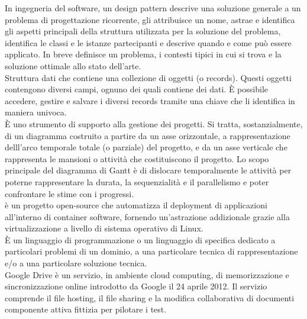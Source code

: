 \documentclass{scalatekids-article}
\begin{document}
 In ingegneria del software, un design pattern descrive una soluzione generale a un problema di progettazione ricorrente, gli attribuisce un nome, astrae e identifica gli aspetti principali della struttura utilizzata per la soluzione del problema, identifica le classi e le istanze partecipanti e descrive quando e come può essere applicato. In breve definisce un problema, i contesti tipici in cui si trova e la soluzione ottimale allo stato dell'arte.
\\

 Struttura dati che contiene una collezione di oggetti (o records).
Questi oggetti contengono diversi campi, ognuno dei quali contiene dei dati.
È possibile accedere, gestire e salvare i diversi records tramite una chiave che li identifica in maniera univoca.
\\

 È uno strumento di supporto alla gestione dei progetti.
Si tratta, sostanzialmente, di un diagramma costruito a partire da un asse orizzontale, a rappresentazione delll'arco temporale totale (o parziale) del progetto, e da un asse verticale che rappresenta le mansioni o attività che costituiscono il progetto.
Lo scopo principale del diagramma di Gantt è di dislocare temporalmente le attività per poterne rappresentare la durata, la sequenzialità e il parallelismo e poter confrontare le stime con i progressi.
\\

 è un progetto open-source che automatizza il deployment di applicazioni all'interno di container software, fornendo un'astrazione addizionale grazie alla virtualizzazione a livello di sistema operativo di Linux.
\\

 È un linguaggio di programmazione o un linguaggio di specifica dedicato a particolari problemi di un dominio, a una particolare tecnica di rappresentazione e/o a una particolare soluzione tecnica.
\\

 Google Drive è un servizio, in ambiente cloud computing, di memorizzazione e sincronizzazione online introdotto da Google il 24 aprile 2012. Il servizio comprende il file hosting, il file sharing e la modifica collaborativa di documenti
\\

 componente attiva fittizia per pilotare i test.
\\
\end{document}
